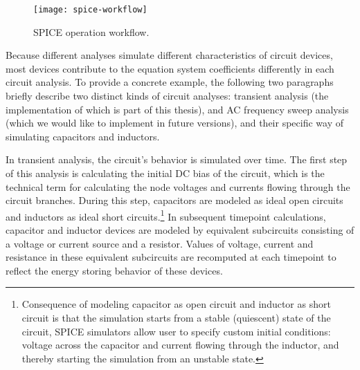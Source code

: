 \begin{figure}[h]
	\centering
	\texttt{[image: spice-workflow]}
	\caption{SPICE operation workflow.}
	\label{fig:spice-workflow}
\end{figure}


Because different analyses simulate different characteristics of circuit devices, most devices contribute to the equation system coefficients differently in each circuit analysis. To provide a concrete example, the following two paragraphs briefly describe two distinct kinds of circuit analyses: transient analysis (the implementation of which is part of this thesis), and AC frequency sweep analysis (which we would like to implement in future versions), and their specific way of simulating capacitors and inductors.

In transient analysis, the circuit's behavior is simulated over time. The first step of this analysis is calculating the initial DC bias of the circuit, which is the technical term for calculating the node voltages and currents flowing through the circuit branches. During this step, capacitors are modeled as ideal open circuits and inductors as ideal short circuits.\footnote{Consequence of modeling capacitor as open circuit and inductor as short circuit is that the simulation starts from a stable (quiescent) state of the circuit, SPICE simulators allow user to specify custom initial conditions: voltage across the capacitor and current flowing through the inductor, and thereby starting the simulation from an unstable state.} In subsequent timepoint calculations, capacitor and inductor devices are modeled by equivalent subcircuits consisting of a voltage or current source and a resistor. Values of voltage, current and resistance in these equivalent subcircuits are recomputed at each timepoint to reflect the energy storing behavior of these devices.


